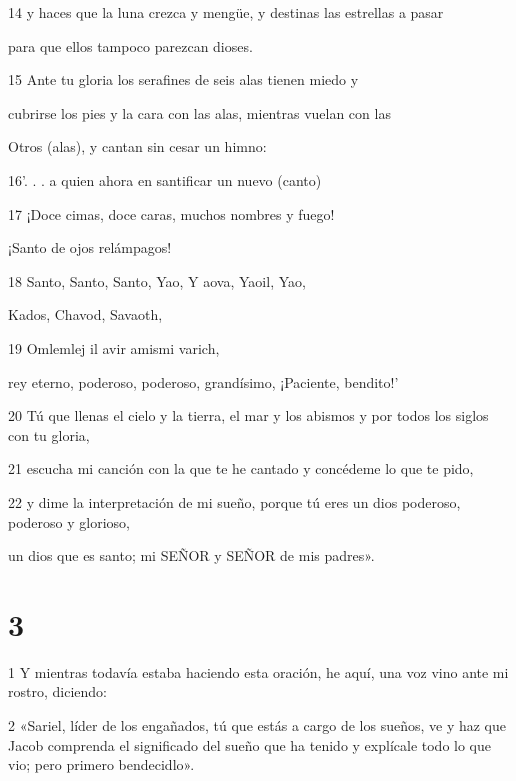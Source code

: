\par 14 y haces que la luna crezca y mengüe, y destinas las estrellas a pasar
\par para que ellos tampoco parezcan dioses.

\par 15 Ante tu gloria los serafines de seis alas tienen miedo y
\par cubrirse los pies y la cara con las alas, mientras vuelan con las
\par Otros (alas), y cantan sin cesar un himno:

\par 16'. . . a quien ahora en santificar un nuevo (canto)

\par 17 ¡Doce cimas, doce caras, muchos nombres y fuego!
\par ¡Santo de ojos relámpagos!

\par 18 Santo, Santo, Santo, Yao, Y aova, Yaoil, Yao,
\par Kados, Chavod, Savaoth,

\par 19 Omlemlej il avir amismi varich,
\par rey eterno, poderoso, poderoso, grandísimo,
¡Paciente, bendito!'

\par 20 Tú que llenas el cielo y la tierra, el mar y los abismos
y por todos los siglos con tu gloria,

\par 21 escucha mi canción con la que te he cantado y concédeme lo que te pido,

\par 22 y dime la interpretación de mi sueño,
porque tú eres un dios poderoso, poderoso y glorioso,
\par un dios que es santo; mi SEÑOR y SEÑOR de mis padres».

\chapter{3}


\par 1 Y mientras todavía estaba haciendo esta oración, he aquí, una voz vino ante mi rostro, diciendo:

\par 2 «Sariel, líder de los engañados, tú que estás a cargo de los sueños, ve y haz que Jacob comprenda el significado del sueño que ha tenido y explícale todo lo que vio; pero primero bendecidlo».

